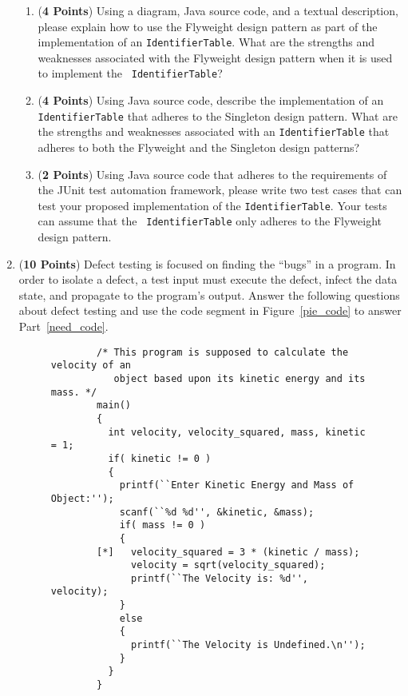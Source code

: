 \documentclass[12pt,epsf,psfig,graphics]{article}
\begin{document}
\begin{enumerate}
\begin{enumerate}
  
\item ({\bf 4 Points}) Using a diagram, Java source code, and a
  textual description, please explain how to use the Flyweight design
  pattern as part of the implementation of an {\tt Identifier\-Table}.
  What are the strengths and weaknesses associated with the Flyweight
  design pattern when it is used to implement the {\tt
    IdentifierTable}?
  
\item ({\bf 4 Points}) Using Java source code, describe the
  implementation of an {\tt IdentifierTable} that adheres to the
  Singleton design pattern.  What are the strengths and weaknesses
  associated with an {\tt IdentifierTable} that adheres to both the
  Flyweight and the Singleton design patterns?
  
\item ({\bf 2 Points}) Using Java source code that adheres to the
  requirements of the JUnit test automation framework, please write
  two test cases that can test your proposed implementation of the
  {\tt IdentifierTable}.  Your tests can assume that the {\tt
    IdentifierTable} only adheres to the Flyweight design pattern.

\end{enumerate}

\newpage

\item ({\bf 10 Points}) Defect testing is focused on finding the
  ``bugs'' in a program.  In order to isolate a defect, a test input
  must execute the defect, infect the data state, and propagate to the
  program's output.  Answer the following questions about defect
  testing and use the code segment in Figure~\ref{pie_code} to answer
  Part~\ref{need_code}.

\begin{figure}[h]

\footnotesize{
\begin{verbatim}
        /* This program is supposed to calculate the velocity of an
           object based upon its kinetic energy and its mass. */
        main() 
        {
          int velocity, velocity_squared, mass, kinetic = 1;
          if( kinetic != 0 ) 
          {
            printf(``Enter Kinetic Energy and Mass of Object:'');
            scanf(``%d %d'', &kinetic, &mass);
            if( mass != 0 ) 
            {
        [*]   velocity_squared = 3 * (kinetic / mass);
              velocity = sqrt(velocity_squared);
              printf(``The Velocity is: %d'', velocity); 
            }
            else 
            {
              printf(``The Velocity is Undefined.\n'');
            }
          }
        }
\end{verbatim} }


\end{figure}
\end{enumerate}
\end{document}
